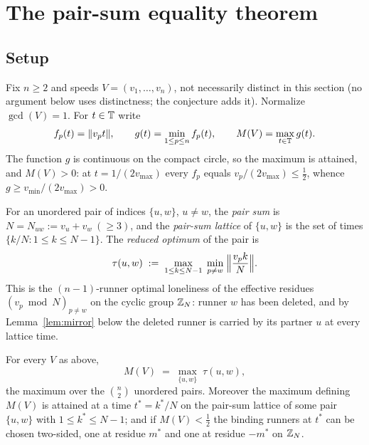 
\section{The pair-sum equality theorem}\label{sec:equality}

\subsection{Setup}

Fix $n\ge 2$ and speeds $V=(v_1,\dots,v_n)$, not necessarily distinct in
this section (no argument below uses distinctness; the conjecture adds it).
Normalize $\gcd(V)=1$. For $t\in\mathbb{T}$ write
\[
f_p(t)=\lVert v_p t \rVert,\qquad
g(t)=\min_{1\le p\le n} f_p(t),\qquad
M(V)=\max_{t\in\mathbb{T}} g(t).
\]
The function $g$ is continuous on the compact circle, so the maximum is
attained, and $M(V)>0$: at $t=1/(2v_{\max})$ every $f_p$ equals
$v_p/(2v_{\max})\le \tfrac12$, whence $g\ge v_{\min}/(2v_{\max})>0$.

\begin{definition}\label{def:pair}
For an unordered pair of indices $\{u,w\}$, $u\ne w$, the \emph{pair sum}
is $N=N_{uw}:=v_u+v_w\ (\ge 3)$, and the \emph{pair-sum lattice} of
$\{u,w\}$ is the set of times $\{k/N : 1\le k\le N-1\}$. The
\emph{reduced optimum} of the pair is
\[
\tau(u,w)\;:=\;\max_{1\le k\le N-1}\;
\min_{p\ne w}\;\Bigl\lVert \frac{v_p k}{N}\Bigr\rVert .
\]
This is the $(n{-}1)$-runner optimal loneliness of the effective residues
$(v_p\bmod N)_{p\ne w}$ on the cyclic group $\mathbb{Z}_N$: runner $w$ has been
deleted, and by Lemma~\ref{lem:mirror} below the deleted runner is carried
by its partner $u$ at every lattice time.
\end{definition}

\begin{theorem}\label{thm:equality}
For every $V$ as above,
\[
M(V)\;=\;\max_{\{u,w\}}\;\tau(u,w),
\]
the maximum over the $\binom{n}{2}$ unordered pairs. Moreover the maximum
defining $M(V)$ is attained at a time $t^\ast=k^\ast/N$ on the pair-sum
lattice of some pair $\{u,w\}$ with $1\le k^\ast\le N-1$; and if
$M(V)<\tfrac12$ the binding runners at $t^\ast$ can be chosen two-sided,
one at residue $m^\ast$ and one at residue $-m^\ast$ on $\mathbb{Z}_N$.
\end{theorem}

